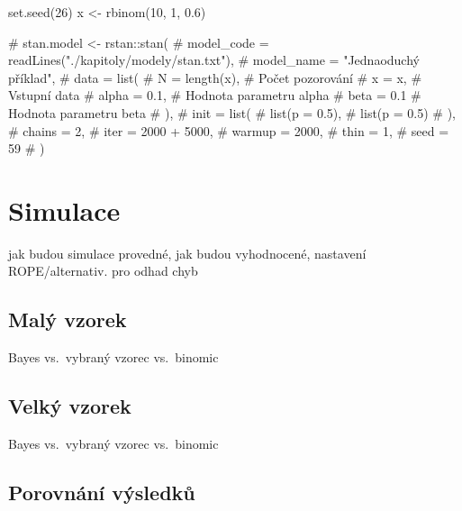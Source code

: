 \documentclass[
  11pt,
  a4paper]{report}
\newenvironment{Shaded}{\begin{snugshade}}{\end{snugshade}}
\newcommand{\CommentTok}[1]{\textcolor[rgb]{0.37,0.37,0.37}{#1}}
\newcommand{\DecValTok}[1]{\textcolor[rgb]{0.68,0.00,0.00}{#1}}
\newcommand{\FloatTok}[1]{\textcolor[rgb]{0.68,0.00,0.00}{#1}}
\newcommand{\FunctionTok}[1]{\textcolor[rgb]{0.28,0.35,0.67}{#1}}
\newcommand{\NormalTok}[1]{\textcolor[rgb]{0.00,0.23,0.31}{#1}}
\newcommand{\OtherTok}[1]{\textcolor[rgb]{0.00,0.23,0.31}{#1}}
\begin{document}
\begin{Shaded}
\begin{Highlighting}[]
\FunctionTok{set.seed}\NormalTok{(}\DecValTok{26}\NormalTok{)}
\NormalTok{x }\OtherTok{\textless{}{-}} \FunctionTok{rbinom}\NormalTok{(}\DecValTok{10}\NormalTok{, }\DecValTok{1}\NormalTok{, }\FloatTok{0.6}\NormalTok{)}

\CommentTok{\# stan.model \textless{}{-} rstan::stan(}
\CommentTok{\#     model\_code = readLines("./kapitoly/modely/stan.txt"),}
\CommentTok{\#     model\_name = "Jednaoduchý příklad",}
\CommentTok{\#     data = list(}
\CommentTok{\#         N     = length(x), \# Počet pozorování}
\CommentTok{\#         x     = x,         \# Vstupní data}
\CommentTok{\#         alpha = 0.1,       \# Hodnota parametru alpha}
\CommentTok{\#         beta  = 0.1        \# Hodnota parametru beta}
\CommentTok{\#     ),}
\CommentTok{\#     init = list(}
\CommentTok{\#         list(p = 0.5),}
\CommentTok{\#         list(p = 0.5)}
\CommentTok{\#     ),}
\CommentTok{\#     chains = 2,}
\CommentTok{\#     iter = 2000 + 5000,}
\CommentTok{\#     warmup = 2000,}
\CommentTok{\#     thin = 1,}
\CommentTok{\#     seed = 59}
\CommentTok{\# )}
\end{Highlighting}
\end{Shaded}

\section{Simulace}\label{simulace}

jak budou simulace provedné, jak budou vyhodnocené, nastavení
ROPE/alternativ. pro odhad chyb

\subsection{Malý vzorek}\label{maluxfd-vzorek}

Bayes vs.~vybraný vzorec vs.~binomic

\subsection{Velký vzorek}\label{velkuxfd-vzorek}

Bayes vs.~vybraný vzorec vs.~binomic

\subsection{Porovnání výsledků}\label{porovnuxe1nuxed-vuxfdsledkux16f}
\end{document}
